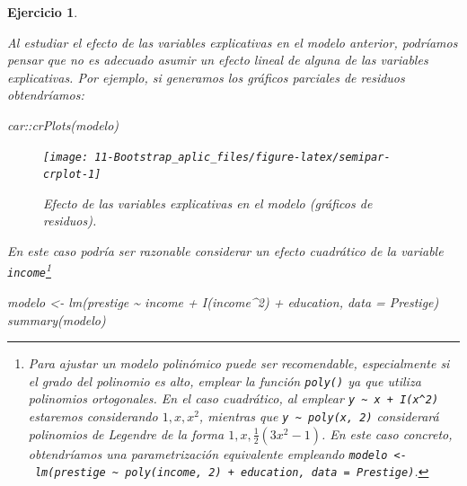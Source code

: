 \documentclass[
  10pt,
]{book}
\newenvironment{Shaded}{\begin{snugshade}}{\end{snugshade}}
\newcommand{\AttributeTok}[1]{\textcolor[rgb]{0.77,0.63,0.00}{#1}}
\newcommand{\DecValTok}[1]{\textcolor[rgb]{0.00,0.00,0.81}{#1}}
\newcommand{\FunctionTok}[1]{\textcolor[rgb]{0.00,0.00,0.00}{#1}}
\newcommand{\NormalTok}[1]{#1}
\newcommand{\OtherTok}[1]{\textcolor[rgb]{0.56,0.35,0.01}{#1}}
\newcommand{\SpecialCharTok}[1]{\textcolor[rgb]{0.00,0.00,0.00}{#1}}
\theoremstyle{break}
\newtheorem{exercise}{Ejercicio}[chapter]
\theoremstyle{nonumberplain}
\let\oldfootnote\footnote
\renewcommand\footnote[1]{\oldfootnote{\hspace{2mm}#1}}
\begin{document}
\begin{exercise}
\protect\hypertarget{exr:test-semipar-cuadratico}{}\label{exr:test-semipar-cuadratico}

Al estudiar el efecto de las variables explicativas en el modelo
anterior, podríamos pensar que no es adecuado asumir un efecto lineal
de alguna de las variables explicativas. Por ejemplo, si generamos los gráficos
parciales de residuos obtendríamos:

\begin{Shaded}
\begin{Highlighting}[]
\NormalTok{car}\SpecialCharTok{::}\FunctionTok{crPlots}\NormalTok{(modelo)}
\end{Highlighting}
\end{Shaded}

\begin{figure}[!htbp]

{\centering \texttt{[image: 11-Bootstrap\_aplic\_files/figure-latex/semipar-crplot-1]} 

}

\caption{Efecto de las variables explicativas en el modelo (gráficos de residuos).}\label{fig:semipar-crplot}
\end{figure}

En este caso podría ser razonable considerar un efecto cuadrático
de la variable \texttt{income}\footnote{Para ajustar un modelo polinómico
  puede ser recomendable, especialmente si el grado del polinomio es alto,
  emplear la función \texttt{poly()} ya que utiliza polinomios ortogonales.
  En el caso cuadrático, al emplear \texttt{y\ \textasciitilde{}\ x\ +\ I(x\^{}2)}
  estaremos considerando \(1, x, x^2\), mientras que \texttt{y\ \textasciitilde{}\ poly(x,\ 2)} considerará
  polinomios de Legendre de la forma \(1, x, \frac{1}{2}(3x^2-1)\).
  En este caso concreto, obtendríamos una parametrización equivalente
  empleando \texttt{modelo\ \textless{}-\ lm(prestige\ \textasciitilde{}\ poly(income,\ 2)\ +\ education,\ data\ =\ Prestige)}.}

\begin{Shaded}
\begin{Highlighting}[]
\NormalTok{modelo }\OtherTok{\textless{}{-}} \FunctionTok{lm}\NormalTok{(prestige }\SpecialCharTok{\textasciitilde{}}\NormalTok{ income }\SpecialCharTok{+} \FunctionTok{I}\NormalTok{(income}\SpecialCharTok{\^{}}\DecValTok{2}\NormalTok{) }\SpecialCharTok{+}\NormalTok{ education, }\AttributeTok{data =}\NormalTok{ Prestige)}
\FunctionTok{summary}\NormalTok{(modelo)}
\end{Highlighting}
\end{Shaded}


\end{exercise}
\end{document}
